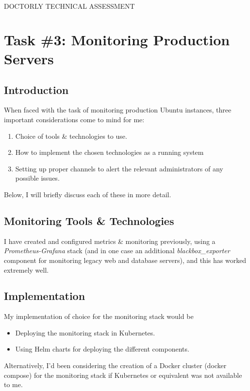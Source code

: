 \documentclass[oneside,titlepage,fleqn,a4paper]{article}
\begin{document}
\begin{titlepage}
\vspace{100mm}
\begin{center}
DOCTORLY TECHNICAL ASSESSMENT \\
\end{center}
\end{titlepage}

\tableofcontents
\newpage
\section{Task \#3: Monitoring Production Servers}
\subsection{Introduction}
When faced with the task of monitoring production Ubuntu instances, three important considerations come to mind for me:
\begin{enumerate}
\item Choice of tools \& technologies to use.
\item How to implement the chosen technologies as a running system
\item Setting up proper channels to alert the relevant administrators of any possible issues.
\end{enumerate}
Below, I will briefly discuss each of these in more detail.

\subsection{Monitoring Tools \& Technologies}
I have created and configured metrics \& monitoring previously, using a \emph{Prometheus-Grafana} stack (and in one case an additional \emph{blackbox\_exporter} component for monitoring legacy web and database servers), and this has worked extremely well.

\subsection{Implementation}
My implementation of choice for the monitoring stack would be
\begin{itemize}
\item Deploying the monitoring stack in Kubernetes.
\item Using Helm charts for deploying the different components.
\end{itemize}

Alternatively, I'd been considering the creation of a Docker cluster (docker compose) for the monitoring stack if Kubernetes or equivalent was not available to me.
\end{document}
